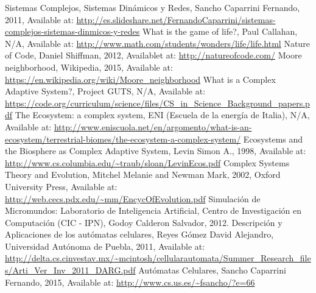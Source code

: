 \begin{thebibliography}{1}
    Sistemas Complejos, Sistemas Dinámicos y Redes, Sancho Caparrini Fernando, 2011, Available at: \url{http://es.slideshare.net/FernandoCaparrini/sistemas-complejos-sistemas-dinmicos-y-redes}
    What is the game of life?, Paul Callahan, N/A, Available at: \url{http://www.math.com/students/wonders/life/life.html}
    Nature of Code, Daniel Shiffman, 2012, Availablet at: \url{http://natureofcode.com/}
    Moore neighborhood, Wikipedia, 2015, Available at: \url{https://en.wikipedia.org/wiki/Moore_neighborhood}
    What is a Complex Adaptive System?, Project GUTS, N/A, Available at: \url{https://code.org/curriculum/science/files/CS_in_Science_Background_papers.pdf}
    The Ecosystem: a complex system, ENI (Escuela de la energía de Italia), N/A, Available at: \url{http://www.eniscuola.net/en/argomento/what-is-an-ecosystem/terrestrial-biomes/the-ecosystem-a-complex-system/}
    Ecosystems and the Biosphere as Complex Adaptive System, Levin Simon A., 1998, Available at: \url{http://www.cs.columbia.edu/~traub/sloan/LevinEcos.pdf}
    Complex Systems Theory and Evolution, Mitchel Melanie and Newman Mark, 2002, Oxford University Press, Available at: \url{http://web.cecs.pdx.edu/~mm/EncycOfEvolution.pdf}
    Simulación de Micromundos: Laboratorio de Inteligencia Artificial, Centro de Investigación en Computación (CIC - IPN), Godoy Calderon Salvador, 2012.
    Descripción y Aplicaciones de los autómatas celulares, Reyes Gómez David Alejandro, Universidad Autónoma de Puebla, 2011, Available at: \url{http://delta.cs.cinvestav.mx/~mcintosh/cellularautomata/Summer_Research_files/Arti_Ver_Inv_2011_DARG.pdf}
    Autómatas Celulares, Sancho Caparrini Fernando, 2015, Available at: \url{http://www.cs.us.es/~fsancho/?e=66}

\end{thebibliography}

